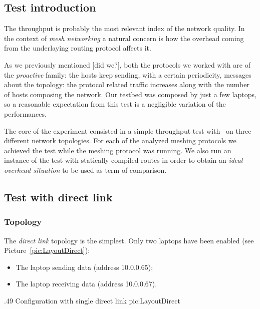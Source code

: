 \subsection{Test introduction}

    The throughput is probably the most relevant index of the network
    quality. In the context of \emph{mesh networking} a natural concern
    is how the overhead coming from the underlaying routing protocol
    affects it.

    As we previously mentioned [did we?], both the protocols we worked
    with are of the \emph{proactive} family: the hosts keep sending,
    with a certain periodicity, messages about the topology: the protocol
    related traffic increases along with the number of hosts composing the
    network.  Our testbed was composed by just a few laptops, so a
    reasonable expectation from this test is a negligible variation of the
    performances.

    The core of the experiment consisted in a simple throughput test with
    \netperf\ on three different network topologies. For each of the
    analyzed meshing protocols we achieved the test while the meshing
    protocol was running. We also run an instance of the test with
    statically compiled routes in order to obtain an \emph{ideal overhead
    situation} to be used as term of comparison.

\subsection{Test with direct link}

    \subsubsection{Topology}

        The \emph{direct link} topology is the simplest. Only two laptops
        have been enabled (see Picture~\ref{pic:LayoutDirect}):
        \begin{itemize}
        \item   The laptop sending data (address 10.0.0.65);
        \item   The laptop receiving data (address 10.0.0.67).
    \end{itemize}

                {.49\columnwidth}
                {Configuration with single direct link}
                {pic:LayoutDirect}

